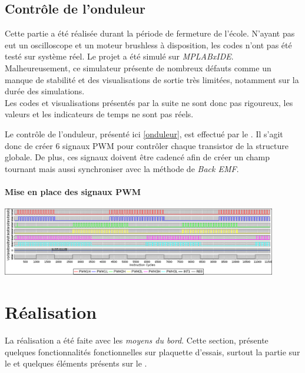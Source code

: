 			\subsection{Contrôle de l'onduleur}			
			\begin{tcolorbox}[center,width=0.9\textwidth, colframe=red!90!orange, colback=orange!25, arc=3mm,boxrule=1mm, sharp corners=east,title=Note]
			Cette partie a été réalisée durant la période de fermeture de l'école. N'ayant pas eut un oscilloscope et un moteur brushless à disposition, les codes n'ont pas été testé sur système réel. Le projet a été simulé sur \textit{MPLABxIDE}. Malheureusement, ce simulateur présente de nombreux défauts comme un manque de stabilité et des visualisations de sortie très limitées, notamment sur la durée des simulations.\\
  			Les codes et visualisations présentés par la suite ne sont donc pas rigoureux, les valeurs et les indicateurs de temps ne sont pas réels.
  			\end{tcolorbox}
  			Le contrôle de l'onduleur, présenté ici \ref{onduleur}, est effectué par le \dspic . Il s'agit donc de créer 6 signaux  PWM pour contrôler chaque transistor de la structure globale. De plus, ces signaux doivent être cadencé afin de créer un champ tournant mais aussi synchroniser avec la méthode de \textit{Back EMF}.
  			\paragraph{Mise en place des signaux PWM}
  			\includegraphics[width=0.9\textwidth]{../Illus/1eressaipwmSYNC.png}
	\section{Réalisation}
			\begin{tcolorbox}[center,width=0.9\textwidth, colframe=red!90!orange, colback=orange!25, arc=3mm,boxrule=1mm, sharp corners=east,title=Note]
			La réalisation a été faite avec les \textit{moyens du bord}. Cette section, présente quelques fonctionnalités fonctionnelles sur plaquette d'essais, surtout la partie sur le \pic et quelques éléments présents sur le \dspic .
  			\end{tcolorbox}
  			
  			
